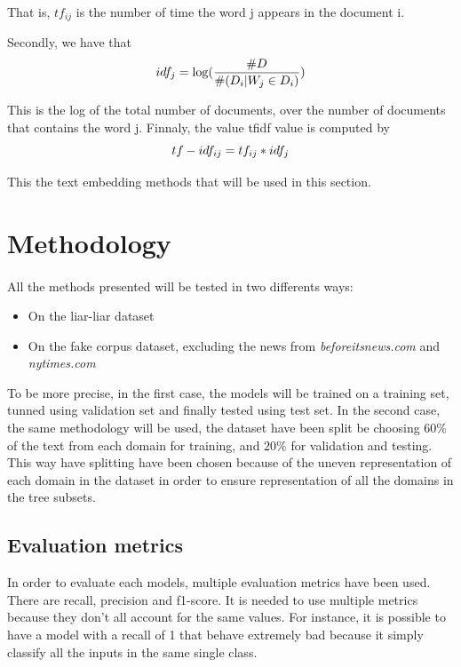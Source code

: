 That is, $tf_{ij}$ is the number of time the word j appears in the document i. 

Secondly, we have that \begin{equation*}
	idf_{j} = \log(\frac{\#D}{\#(D_i | W_j \in D_i)}) \\
\end{equation*}

This is the log of the total number of documents, over the number of documents that contains the word j.
Finnaly, the value tfidf value is computed by \begin{equation}
	tf-idf_{ij} = tf_{ij} * idf_{j} \\
\end{equation}

This the text embedding methods that will be used in this section. 

\section{Methodology}
\paragraph{} All the methods presented will be tested in two differents ways: 
\begin{itemize}
	\item On the liar-liar dataset
	\item On the fake corpus dataset, excluding the news from \textit{beforeitsnews.com} and \textit{nytimes.com}
\end{itemize}

To be more precise, in the first case, the models will be trained on a training set, tunned using validation set and finally tested using test set. In the second case, the same methodology will be used, the dataset have been split be choosing $60\%$ of the text from each domain for training, and $20\%$ for validation and testing. This way have splitting have been chosen because of the uneven representation of each domain in the dataset in order to ensure representation of all the domains in the tree subsets. 

\subsection{Evaluation metrics}
In order to evaluate each models, multiple evaluation metrics have been used. There are recall, precision and f1-score. It is needed to use multiple metrics because they don't all account for the same values. For instance, it is possible to have a model with a recall of 1 that behave extremely bad because it simply classify all the inputs in the same single class. 

